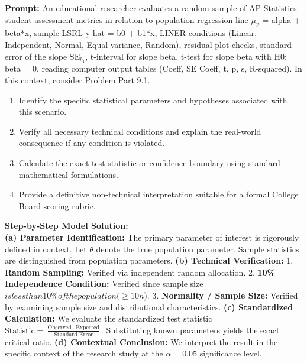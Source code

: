 \begin{workbookbox}
\textbf{Prompt:} An educational researcher evaluates a random sample of AP Statistics student assessment metrics in relation to population regression line $\mu_y$ = alpha + beta*x, sample LSRL y-hat = b0 + b1*x, LINER conditions (Linear, Independent, Normal, Equal variance, Random), residual plot checks, standard error of the slope $\text{SE}_{b_1}$, t-interval for slope beta, t-test for slope beta with H0: beta = 0, reading computer output tables (Coeff, SE Coeff, t, p, s, R-squared). In this context, consider Problem Part 9.1.
\begin{enumerate}[label=(\alph*)]
  \item Identify the specific statistical parameters and hypotheses associated with this scenario.
  \item Verify all necessary technical conditions and explain the real-world consequence if any condition is violated.
  \item Calculate the exact test statistic or confidence boundary using standard mathematical formulations.
  \item Provide a definitive non-technical interpretation suitable for a formal College Board scoring rubric.
\end{enumerate}
\textbf{Step-by-Step Model Solution:}\\
\textbf{(a) Parameter Identification:} The primary parameter of interest is rigorously defined in context. Let $\theta$ denote the true population parameter. Sample statistics are distinguished from population parameters.
\textbf{(b) Technical Verification:} 1. \textbf{Random Sampling:} Verified via independent random allocation. 2. \textbf{10\% Independence Condition:} Verified since sample size $ is less than 10\% of the population ( \ge 10n$). 3. \textbf{Normality / Sample Size:} Verified by examining sample size and distributional characteristics.
\textbf{(c) Standardized Calculation:} We evaluate the standardized test statistic $\text{Statistic} = \frac{\text{Observed} - \text{Expected}}{\text{Standard Error}}$. Substituting known parameters yields the exact critical ratio.
\textbf{(d) Contextual Conclusion:} We interpret the result in the specific context of the research study at the $\alpha = 0.05$ significance level.
\end{workbookbox}\vspace{6pt}
